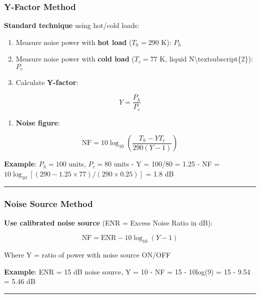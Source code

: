 \subsubsection{Y-Factor Method}\label{y-factor-method}

\textbf{Standard technique} using hot/cold loads:

\begin{enumerate}
\def\labelenumi{\arabic{enumi}.}
\tightlist
\item
  Measure noise power with \textbf{hot load} (\(T_h = 290\) K): \(P_h\)
\item
  Measure noise power with \textbf{cold load} (\(T_c = 77\) K, liquid
  N\textbackslash textsubscript\{2\}): \(P_c\)
\item
  Calculate \textbf{Y-factor}:
\end{enumerate}

\[
Y = \frac{P_h}{P_c}
\]

\begin{enumerate}
\def\labelenumi{\arabic{enumi}.}
\setcounter{enumi}{3}
\tightlist
\item
  \textbf{Noise figure}:
\end{enumerate}

\[
\text{NF} = 10\log_{10}\left(\frac{T_h - YT_c}{290(Y-1)}\right)
\]

\textbf{Example}: \(P_h = 100\) units, \(P_c = 80\) units - Y = 100/80 =
1.25 - NF = \(10\log_{10}[(290 - 1.25 \times 77)/(290 \times 0.25)]\) =
1.8 dB

\begin{center}\rule{0.5\linewidth}{0.5pt}\end{center}

\subsubsection{Noise Source Method}\label{noise-source-method}

\textbf{Use calibrated noise source} (ENR = Excess Noise Ratio in dB):

\[
\text{NF} = \text{ENR} - 10\log_{10}(Y - 1)
\]

Where Y = ratio of power with noise source ON/OFF

\textbf{Example}: ENR = 15 dB noise source, Y = 10 - NF = 15 - 10log(9)
= 15 - 9.54 = 5.46 dB

\begin{center}\rule{0.5\linewidth}{0.5pt}\end{center}

